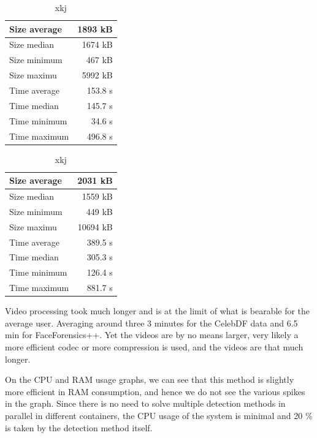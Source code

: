 \begin{table}[H]
    \begin{minipage}[c]{.5\textwidth}
        \centering
        \begin{tabular}{|l|r|}
            \hline
            Size average & 1893 kB \\ \hline
            Size median & 1674 kB \\ \hline
            Size minimum & 467 kB \\ \hline
            Size maximu & 5992 kB \\ \hline
            Time average & 153.8 s \\ \hline
            Time median & 145.7 s \\ \hline
            Time minimum & 34.6 s \\ \hline
            Time maximum & 496.8 s \\ \hline
        \end{tabular}
        \caption{xkj}
    \end{minipage}
    \begin{minipage}[c]{.5\textwidth}
        \centering
        \begin{tabular}{|l|r|}
            \hline
            Size average & 2031 kB \\ \hline
            Size median & 1559 kB \\ \hline
            Size minimum & 449 kB \\ \hline
            Size maximu & 10694 kB \\ \hline
            Time average & 389.5 s \\ \hline
            Time median & 305.3 s \\ \hline
            Time minimum & 126.4 s \\ \hline
            Time maximum & 881.7 s \\ \hline
        \end{tabular}
        \caption{xkj}
    \end{minipage}
\end{table}

Video processing took much longer and is at the limit of what is bearable for the average user. Averaging around three 3 minutes for the CelebDF data and 6.5 min for FaceForensics++. Yet the videos are by no means larger, very likely a more efficient codec or more compression is used, and the videos are that much longer.

On the CPU and RAM usage graphs, we can see that this method is slightly more efficient in RAM consumption, and hence we do not see the various spikes in the graph. Since there is no need to solve multiple detection methods in parallel in different containers, the CPU usage of the system is minimal and 20 \% is taken by the detection method itself.

